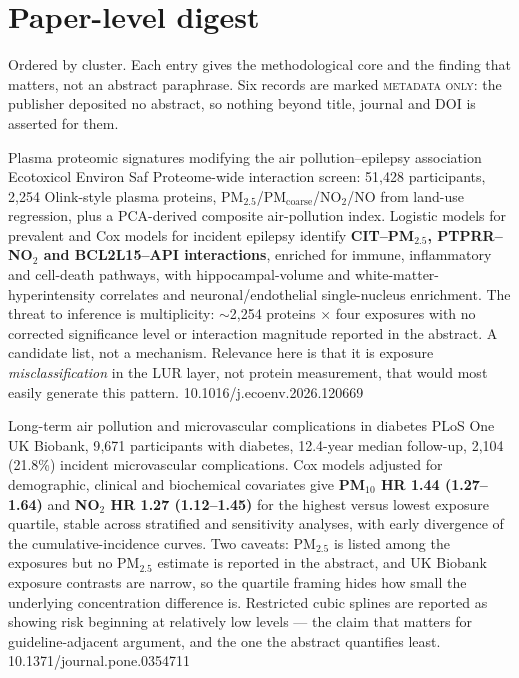 \documentclass[10pt]{article}
\begin{document}
\clearpage

\section*{\sffamily\bfseries\color{Deep}Paper-level digest}
\vspace{-1.5mm}{\color{Amber}\rule{\linewidth}{1.1pt}}\vspace{1mm}

{\fontsize{7.4}{9}\selectfont\color{Slate}Ordered by cluster. Each entry gives the
methodological core and the finding that matters, not an abstract paraphrase. Six records
are marked \textsc{metadata only}: the publisher deposited no abstract, so nothing beyond
title, journal and DOI is asserted for them.\par}


{Plasma proteomic signatures modifying the air pollution--epilepsy association}
{Ecotoxicol Environ Saf}
{Proteome-wide interaction screen: 51{,}428 participants, 2{,}254 Olink-style plasma
proteins, PM$_{2.5}$/PM$_{\mathrm{coarse}}$/NO$_2$/NO from land-use regression, plus a PCA-derived
composite air-pollution index. Logistic models for prevalent and Cox models for incident
epilepsy identify \textbf{CIT--PM$_{2.5}$, PTPRR--NO$_2$ and BCL2L15--API interactions},
enriched for immune, inflammatory and cell-death pathways, with hippocampal-volume and
white-matter-hyperintensity correlates and neuronal/endothelial single-nucleus enrichment.
The threat to inference is multiplicity: $\sim$2{,}254 proteins $\times$ four exposures with
no corrected significance level or interaction magnitude reported in the abstract. A
candidate list, not a mechanism. Relevance here is that it is exposure \emph{misclassification}
in the LUR layer, not protein measurement, that would most easily generate this pattern.}
{10.1016/j.ecoenv.2026.120669}


{Long-term air pollution and microvascular complications in diabetes}
{PLoS One}
{UK Biobank, 9{,}671 participants with diabetes, 12.4-year median follow-up, 2{,}104 (21.8\%)
incident microvascular complications. Cox models adjusted for demographic, clinical and
biochemical covariates give \textbf{PM$_{10}$ HR 1.44 (1.27--1.64)} and
\textbf{NO$_2$ HR 1.27 (1.12--1.45)} for the highest versus lowest exposure quartile, stable
across stratified and sensitivity analyses, with early divergence of the cumulative-incidence
curves. Two caveats: PM$_{2.5}$ is listed among the exposures but no PM$_{2.5}$ estimate is
reported in the abstract, and UK Biobank exposure contrasts are narrow, so the quartile
framing hides how small the underlying concentration difference is. Restricted cubic splines
are reported as showing risk beginning at relatively low levels --- the claim that matters
for guideline-adjacent argument, and the one the abstract quantifies least.}
{10.1371/journal.pone.0354711}
\end{document}
